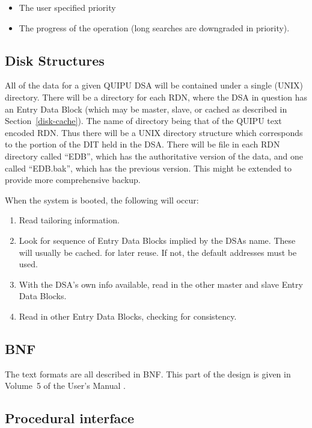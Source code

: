 \begin {itemize}
\item  The user specified priority

\item The progress of the operation (long searches are downgraded in
priority).
\end {itemize}


\subsection {Disk Structures}

All of
the data for a given QUIPU DSA 
will be
contained under a single (UNIX) directory.  There will be a directory for
each RDN, where the DSA in question has an Entry Data Block (which may be
master, slave, or cached as described in Section~\ref{disk-cache}).
The name of directory being that of the QUIPU text encoded RDN.
Thus there will be a UNIX directory structure which corresponds to the
portion of the DIT held in the DSA.
There will be file in each RDN directory called ``EDB'', which has the
authoritative version of the data, and one called ``EDB.bak'', which has the
previous version.
This might be extended to provide more comprehensive backup.


When the system is booted, the following will occur:

\begin {enumerate}
\item 
Read tailoring information.
\item 
Look for sequence of Entry Data Blocks implied by the DSAs name.
These will usually be cached. for later reuse.
If not, the default addresses must be used.
\item 
With the DSA's own info available, read in the other master and slave Entry
Data Blocks.
\item 
Read in other Entry Data Blocks, checking for consistency.
\end {enumerate}

\subsection {BNF}

The text formats are all described in BNF.  This part of the design is given
in Volume~5 of the User's Manual \cite{QUIPU.Manual}.

\subsection {Procedural interface}

